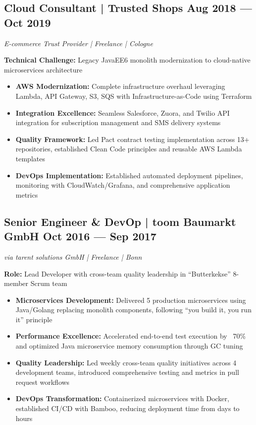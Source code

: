 \documentclass[10pt,a4paper]{article}
\begin{document}
\vspace{4pt}

\subsection{Cloud Consultant | Trusted Shops \hfill Aug 2018 --- Oct 2019}
\textit{E-commerce Trust Provider | Freelance | Cologne}

\textbf{Technical Challenge:} Legacy JavaEE6 monolith modernization to cloud-native microservices architecture
\begin{itemize}
\item \textbf{AWS Modernization:} Complete infrastructure overhaul leveraging Lambda, API Gateway, S3, SQS with Infrastructure-as-Code using Terraform
\item \textbf{Integration Excellence:} Seamless Salesforce, Zuora, and Twilio API integration for subscription management and SMS delivery systems
\item \textbf{Quality Framework:} Led Pact contract testing implementation across 13+ repositories, established Clean Code principles and reusable AWS Lambda templates
\item \textbf{DevOps Implementation:} Established automated deployment pipelines, monitoring with CloudWatch/Grafana, and comprehensive application metrics
\end{itemize}

\newpage

\subsection{Senior Engineer \& DevOp | toom Baumarkt GmbH \hfill Oct 2016 --- Sep 2017}
\textit{via tarent solutions GmbH | Freelance | Bonn}

\textbf{Role:} Lead Developer with cross-team quality leadership in ``Butterkekse'' 8-member Scrum team
\begin{itemize}
\item \textbf{Microservices Development:} Delivered 5 production microservices using Java/Golang replacing monolith components, following ``you build it, you run it'' principle
\item \textbf{Performance Excellence:} Accelerated end-to-end test execution by ~70\% and optimized Java microservice memory consumption through GC tuning
\item \textbf{Quality Leadership:} Led weekly cross-team quality initiatives across 4 development teams, introduced comprehensive testing and metrics in pull request workflows
\item \textbf{DevOps Transformation:} Containerized microservices with Docker, established CI/CD with Bamboo, reducing deployment time from days to hours
\end{itemize}
\end{document}
